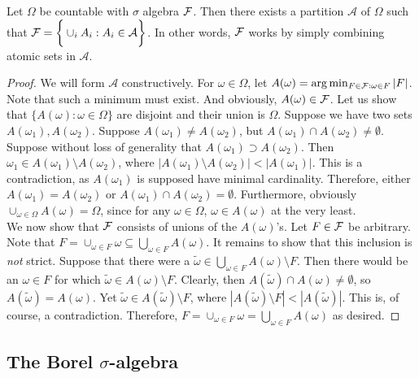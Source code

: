 \begin{theorem} 
    Let $\Omega$ be countable with $\sigma$ algebra $\mathcal F$. Then there exists a 
    partition $\mathcal A$ of $\Omega$ such that $\mathcal F = \bigg\{ \cup_i A_i : A_i \in \mathcal A \bigg\}$. 
    In other words, $\mathcal F$ works by simply combining atomic sets in $\mathcal A$.
\end{theorem}
\begin{proof} 
    We will form $\mathcal A$ constructively. For $\omega \in \Omega$, let $A(\omega) = \arg\min_{F \in \mathcal F : \omega \in F}|F|$.
    Note that such a minimum must exist. And obviously, $A(\omega) \in \mathcal F$. Let us show that 
    $\{A(\omega) : \omega \in \Omega\}$ are disjoint and their union is $\Omega$. Suppose we have two sets 
    $A(\omega_1), A(\omega_2)$. Suppose $A(\omega_1) \neq A(\omega_2)$, but $A(\omega_1) \cap A(\omega_2) \neq \emptyset$. 
    Suppose without loss of generality that $A(\omega_1) \supset A(\omega_2)$. Then 
    $\omega_1 \in A(\omega_1) \setminus A(\omega_2)$, where $|A(\omega_1) \setminus A(\omega_2)| < |A(\omega_1)|$. 
    This is a contradiction, as $A(\omega_1)$ is supposed have minimal cardinality. 
    Therefore, either $A(\omega_1) = A(\omega_2)$ or $A(\omega_1) \cap A(\omega_2) = \emptyset$. Furthermore, obviously 
    $\cup_{\omega \in \Omega}A(\omega) = \Omega$, since for any $\omega \in \Omega$, $\omega \in A(\omega)$ at the 
    very least.\\ 
    
    We now show that $\mathcal F$ consists of unions of the $A(\omega)$'s. Let $F \in \mathcal F$ be arbitrary. 
    Note that $F = \cup_{\omega \in F}\omega \subseteq \bigcup_{\omega \in F}A(\omega)$. It remains to show that 
    this inclusion is \emph{not} strict. Suppose that there were a $\tilde{\omega} \in \bigcup_{\omega \in F}A(\omega) \setminus F$. 
    Then there would be an $\omega \in F$ for which $\tilde{\omega} \in A(\omega) \setminus F$. Clearly, then 
    $A(\tilde{\omega}) \cap A(\omega) \neq \emptyset$, so $A(\tilde{\omega}) = A(\omega)$. Yet 
    $\tilde{\omega} \in A(\tilde{\omega})\setminus F$, where $| A(\tilde{\omega})\setminus F| < |A(\tilde{\omega})|$. 
    This is, of course, a contradiction. Therefore,  $F = \cup_{\omega \in F}\omega = \bigcup_{\omega \in F}A(\omega)$ as 
    desired.

\end{proof}


\subsection{The Borel $\sigma$-algebra}

